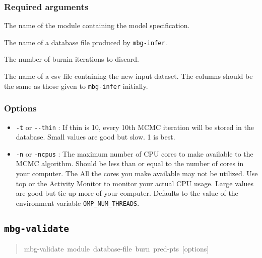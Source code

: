 \subsubsection{Required arguments%
}
\setcounter{listcnt0}{0}
\begin{list}{.}
{
\setlength{\rightmargin}{\leftmargin}
}

\item The name of the module containing the model specification.

\item The name of a database file produced by \texttt{mbg-infer}.

\item The number of burnin iterations to discard.

\item The name of a csv file containing the new input dataset. The columns should be the same
as those given to \texttt{mbg-infer} initially.
\end{list}




\subsubsection{Options%
}
%
\begin{itemize}

\item \texttt{-t} or \texttt{-{}-thin} : If thin is 10, every 10th MCMC iteration will be stored in the
database. Small values are good but slow. 1 is best.

\item \texttt{-n} or \texttt{-ncpus} : The maximum number of CPU cores to make available to the MCMC
algorithm. Should be less than or equal to the number of cores in your computer. The
All the cores you make available may not be utilized. Use top or the Activity Monitor
to monitor your actual CPU usage. Large values are good but tie up more of your computer.
Defaults to the value of the environment variable \texttt{OMP\_NUM\_THREADS}.

\end{itemize}




\subsection{\texttt{mbg-validate}%
}
%
\begin{quote}{\ttfamily \raggedright \noindent
mbg-validate~module~database-file~burn~pred-pts~{[}options{]}
}
\end{quote}

